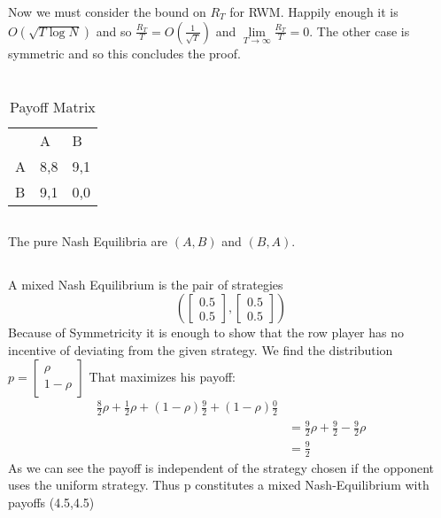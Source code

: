 \documentclass[]{article}
\begin{document}
\noindent Now we must consider the bound on $R_T$ for RWM. Happily enough it is $O\left(\sqrt{T \log N}\right)$ and so $\frac{R_T}{T} = O\left(\frac{1}{\sqrt{T}}\right)$ and $\lim\limits_{T \rightarrow \infty} \frac{R_T}{T} = 0$. The other case is symmetric and so this concludes the proof.
\section{}
\begin{table}[H]
	\centering
	\caption{Payoff Matrix}
	\label{fig:C3}
	\begin{tabular}{lll}
		& A                        & B                        \\ \cline{2-3} 
		\multicolumn{1}{l|}{A} & \multicolumn{1}{l|}{8,8} & \multicolumn{1}{l|}{9,1} \\ \cline{2-3} 
		\multicolumn{1}{l|}{B} & \multicolumn{1}{l|}{9,1} & \multicolumn{1}{l|}{0,0} \\ \cline{2-3} 
	\end{tabular}
\end{table}
\subsection{}
The pure Nash Equilibria are $\left( A, B \right)$ and $\left( B, A \right)$.
\subsection{}
A mixed Nash Equilibrium is the pair of strategies
\[\left(
    \begin{bmatrix}
      0.5 \\ 0.5 
    \end{bmatrix}
,    \begin{bmatrix}
      0.5 \\ 0.5 
    \end{bmatrix}\right) \]
Because of Symmetricity it is enough to show that the row player has no incentive of deviating from the given strategy. We find the distribution $p =     \begin{bmatrix}
      \rho \\ 1-\rho  
    \end{bmatrix} $ 
That maximizes his payoff:
\begin{align*} 
   \frac{8}{2}\rho + \frac{1}{2}\rho + (1-\rho) \frac{9}{2} + (1-\rho) \frac{0}{2} \\
  &= \frac{9}{2}\rho + \frac{9}{2} - \frac{9}{2}\rho \\
  &= \frac{9}{2}     
\end{align*}
As we can see the payoff is independent of the strategy chosen if the opponent uses the uniform strategy. Thus p constitutes a mixed Nash-Equilibrium with payoffs (4.5,4.5)
\end{document}
